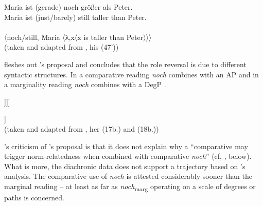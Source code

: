 \documentclass[output=paper,
modfonts
]{langscibook}
\begin{document}
\ea\gll Maria ist (gerade) noch größer als Peter.\\
       Maria ist {(just/barely)} still taller than Peter.\\
 \label{NOCH_MARG_EXP} \\
\z
\ea 〈noch/still, Maria 〈λ,x〈x is taller than Peter〉〉〉 \label{koenigs_noch_marg} \\ (taken and adapted from \citeauthor{koenig1977} \citeyearpar{koenig1977}, his (47'))\z


\noindent\citet{umbach2009a_comp} fleshes out \citeauthor{koenig1977}'s \citeyearpar{koenig1977} proposal and concludes that the role reversal is due to different syntactic structures. In a comparative reading \textit{noch} combines with an AP  and in a marginality reading \textit{noch} combines with a DegP .

\begin{exe}
\label{NOCH_COMP_EXPPrime}\relax [$_{\textnormal{\footnotesize{CP}}}$ Maria [$_{\textnormal{\footnotesize{VP}}}$ ist [$_{\textnormal{\footnotesize{DegP}}}$ \textbf{[$_{\textbf{\footnotesize{AP}}}$ noch [$_{\textbf{\footnotesize{AP}}}$ größer ]]} [als Adam]]]] 
\end{exe}

\begin{exe}
\label{NOCH_MARG_EXPPrime}\relax [$_{\textnormal{\footnotesize{CP}}}$ Maria [$_{\textnormal{\footnotesize{VP}}}$ ist \textbf{[$_{\textbf{\footnotesize{DegP}}}$ noch [$_{\textbf{\footnotesize{DegP}}}$ [$_{\textbf{\footnotesize{AP}}}$ größer] [als Peter]]]} ]] \\ (taken and adapted from \citeauthor{umbach2009a_comp} \citeyearpar{umbach2009a_comp}, her (17b.) and (18b.))
\end{exe}


\noindent\citeauthor{umbach2009a_comp}'s \citeyearpar{umbach2009a_comp} criticism of \citeauthor{koenig1977}'s \citeyearpar{koenig1977} proposal is that it does not explain why a ``comparative may trigger norm-relatedness when combined with comparative \textit{noch}'' (cf, , below). What is more, the diachronic data does not support a trajectory based on \citeauthor{koenig1977}'s analysis. The comparative use of \textit{noch} is attested considerably sooner than the marginal reading -- at least as far as \textit{noch}\textsubscript{marg} operating on a scale of degrees or paths is concerned.
\end{document}
